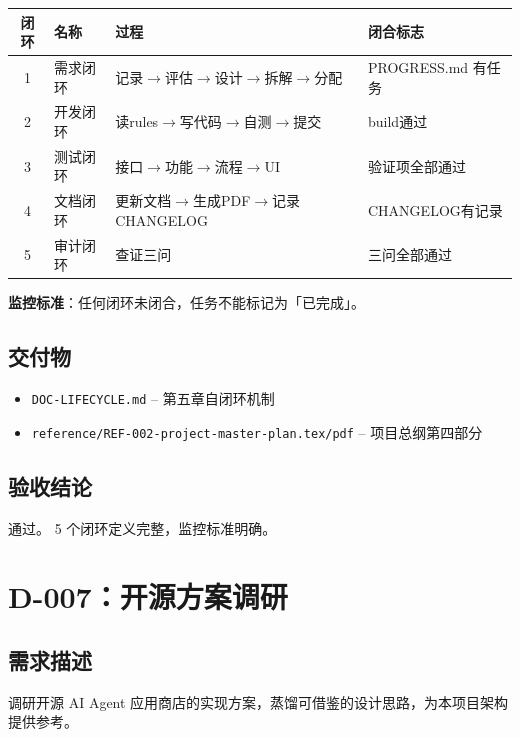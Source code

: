 \documentclass[11pt,a4paper]{article}
\begin{document}
\begin{table}[h]
\centering
\begin{tabular}{clp{5cm}p{3cm}}
\toprule
\textbf{闭环} & \textbf{名称} & \textbf{过程} & \textbf{闭合标志} \\
\midrule
1 & 需求闭环 & 记录$\to$评估$\to$设计$\to$拆解$\to$分配 & PROGRESS.md 有任务 \\
2 & 开发闭环 & 读rules$\to$写代码$\to$自测$\to$提交 & build通过 \\
3 & 测试闭环 & 接口$\to$功能$\to$流程$\to$UI & 验证项全部通过 \\
4 & 文档闭环 & 更新文档$\to$生成PDF$\to$记录CHANGELOG & CHANGELOG有记录 \\
5 & 审计闭环 & 查证三问 & 三问全部通过 \\
\bottomrule
\end{tabular}
\end{table}

\textbf{监控标准}：任何闭环未闭合，任务不能标记为「已完成」。

\subsection{交付物}

\begin{itemize}[nosep]
  \item \texttt{DOC-LIFECYCLE.md} -- 第五章自闭环机制
  \item \texttt{reference/REF-002-project-master-plan.tex/pdf} -- 项目总纲第四部分
\end{itemize}

\subsection{验收结论}

\textcolor{success}{通过。} 5 个闭环定义完整，监控标准明确。

\section{D-007：开源方案调研}

\subsection{需求描述}

调研开源 AI Agent 应用商店的实现方案，蒸馏可借鉴的设计思路，为本项目架构提供参考。
\end{document}
